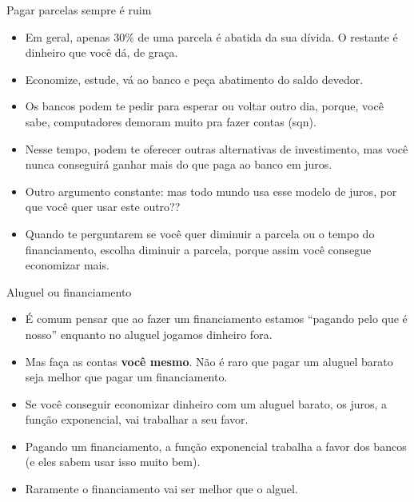 \documentclass[]{beamer}
\begin{document}
\begin{frame}{Pagar parcelas sempre é ruim}

  \begin{itemize}
  \item Em geral, apenas $30\%$ de uma parcela é abatida da
    sua dívida. O restante é dinheiro que você dá, de graça.
    \pause
  \item Economize, estude, vá ao banco e peça abatimento do
    saldo devedor.
    \pause
    \item Os bancos podem te pedir para esperar ou voltar
      outro dia, porque, você sabe, computadores demoram
      muito pra fazer contas (sqn).
      \pause
    \item Nesse tempo, podem te oferecer outras alternativas
      de investimento, mas você nunca conseguirá ganhar mais
      do que paga ao banco em juros.
      \pause
    \item Outro argumento constante: mas todo mundo usa esse
      modelo de juros, por que você quer usar este outro??
      \pause
    \item Quando te perguntarem se você quer diminuir a
      parcela ou o tempo do financiamento, escolha diminuir
      a parcela, porque assim você consegue economizar mais.
  \end{itemize}

\end{frame}


\begin{frame}{Aluguel ou financiamento}

\begin{itemize}
\item É comum pensar que ao fazer um financiamento estamos
  ``pagando pelo que é nosso'' enquanto no aluguel jogamos
  dinheiro fora.
  \pause
\item Mas faça as contas \textbf{você mesmo}. Não é raro que
  pagar um aluguel barato seja melhor que pagar um
  financiamento.
\item Se você conseguir economizar dinheiro com um aluguel
  barato, os juros, a função exponencial, vai trabalhar a
  seu favor.
\item Pagando um financiamento, a função exponencial
  trabalha a favor dos bancos (e eles sabem usar isso muito
  bem).
  \pause
\item Raramente o financiamento vai ser melhor que o alguel.
\end{itemize}
  
\end{frame}
\end{document}

